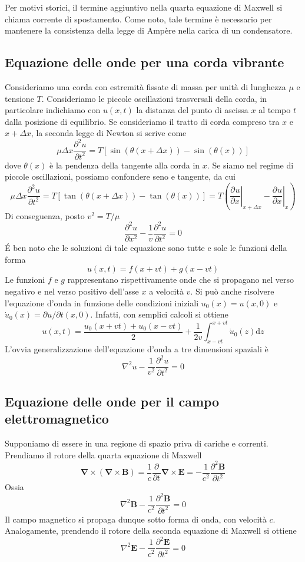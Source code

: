 \documentclass[a4paper,11pt]{book}
\newcommand{\dif}{\mathrm{d}}
\newcommand{\der}[3][]{\frac{\partial ^{#1}#2}{\partial {#3}^{#1}}}
\let\oldnabla\nabla
\renewcommand{\nabla}{\vec{\oldnabla}}
\newcommand{\lap}{\oldnabla^2}
\renewcommand{\vec}[1]{\mathbf{#1}}
\theoremstyle{theorem}
\theoremstyle{definition}
\begin{document}
Per motivi storici, il termine aggiuntivo nella quarta equazione di Maxwell si chiama corrente di spostamento. Come noto, tale termine è necessario per mantenere la consistenza della legge di Ampère nella carica di un condensatore.
\subsection{Equazione delle onde per una corda vibrante}
Consideriamo una corda con estremità fissate di massa per unità di lunghezza $\mu$ e tensione $T$. Consideriamo le piccole oscillazioni trasversali della corda, in particolare indichiamo con $u(x,t)$ la distanza del punto di ascissa $x$ al tempo $t$ dalla posizione di equilibrio. Se consideriamo il tratto di corda compreso tra $x$ e $x+\Delta x$, la seconda legge di Newton si scrive come
\[\mu\Delta x\der[2]{u}{t}=T\left[\sin(\theta(x+\Delta x))-\sin(\theta(x))\right]\]
dove $\theta(x)$ è la pendenza della tangente alla corda in $x$. Se siamo nel regime di piccole oscillazioni, possiamo confondere seno e tangente, da cui
\[\mu\Delta x\der[2]{u}{t}=T\left[\tan(\theta(x+\Delta x))-\tan(\theta(x))\right]=T\left(\left.\der{u}{x}\right|_{x+\Delta x}-\left.\der{u}{x}\right|_{x}\right)\]
Di conseguenza, posto $v^2=T/\mu$
\[\der[2]{u}{x}-\frac{1}{v}\der[2]{u}{t}=0\]
\'E ben noto che le soluzioni di tale equazione sono tutte e sole le funzioni della forma
\[u(x,t)=f(x+vt)+g(x-vt)\]
Le funzioni $f$ e $g$ rappresentano rispettivamente onde che si propagano nel verso negativo e nel verso positivo dell'asse $x$ a velocità $v$. Si può anche risolvere l'equazione d'onda in funzione delle condizioni iniziali $u_0(x)=u(x,0)$ e $\dot{u}_0(x)=\partial u/\partial t(x,0)$. Infatti, con semplici calcoli si ottiene
\[u(x,t)=\frac{u_0(x+vt)+u_0(x-vt)}{2}+\frac{1}{2v}\int_{x-vt}^{x+vt}\dot{u}_0(z)\dif z\]
L'ovvia generalizzazione dell'equazione d'onda a tre dimensioni spaziali è
\[\lap u-\frac{1}{v^2}\der[2]{u}{t}=0\]
\subsection{Equazione delle onde per il campo elettromagnetico}
Supponiamo di essere in una regione di spazio priva di cariche e correnti. Prendiamo il rotore della quarta equazione di Maxwell
\[\nabla\times(\nabla\times\vec{B})=\frac{1}{c}\der{}{t}\nabla\times\vec{E}=-\frac{1}{c^2}\der[2]{\vec{B}}{t}\]
Ossia
\[\lap\vec{B}-\frac{1}{c^2}\der[2]{\vec{B}}{t}=0\]
Il campo magnetico si propaga dunque sotto forma di onda, con velocità $c$. Analogamente, prendendo il rotore della seconda equazione di Maxwell si ottiene
\[\lap\vec{E}-\frac{1}{c^2}\der[2]{\vec{E}}{t}=0\]
\newpage
\end{document}
